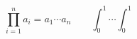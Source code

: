\documentclass[nofonts]{ctexart}
\begin{document}
\[
	\prod_{i=1}^n a_i = a_1 \dotsm a_n \qquad \int_0^1\dotsi\int_0^1
\]
\end{document}
